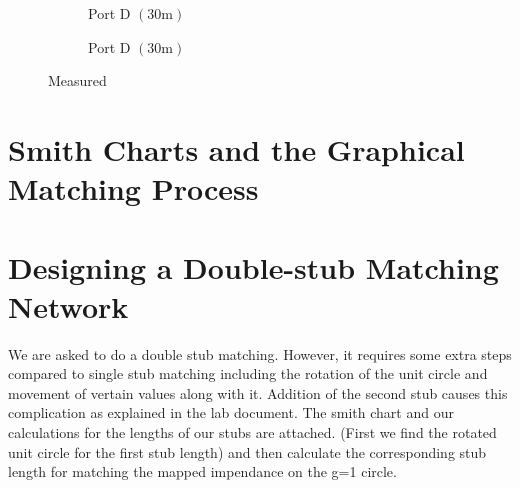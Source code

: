\documentclass[10pt]{article}
\begin{document}
\begin{figure}[ht]
\begin{subfigure}[b]{0.45\textwidth}
    \caption{Port D $(30\text{m})$}
  \end{subfigure}
  \begin{subfigure}[b]{0.37\textwidth}
    \caption{Port D $(30\text{m})$}
  \end{subfigure}
  \caption{Measured }
  \label{v_t_matched_tline}
\end{figure}

\section{Smith Charts and the Graphical Matching Process}



\section{Designing a Double-stub Matching Network}

We are asked to do a double stub matching. However, it requires some extra steps compared to single stub matching
including the rotation of the unit circle and movement of vertain values along with it. Addition of the second stub
causes this complication as explained in the lab document. The smith chart and our calculations for the lengths of 
our stubs are attached. (First we find the rotated unit circle for the first stub length) and then calculate the corresponding
stub length for matching the mapped impendance on the g=1 circle.
\end{document}
